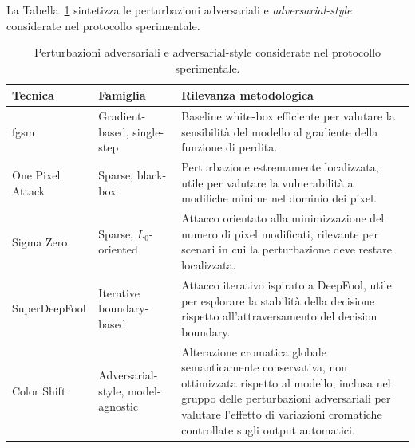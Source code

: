 La Tabella~\ref{tab:background_attack_families} sintetizza le perturbazioni adversariali e \textit{adversarial-style} considerate nel protocollo sperimentale.
\begin{table}[htbp]
    \centering
    \small
    \renewcommand{\arraystretch}{1.25}
    \begin{tabularx}{\textwidth}{@{}l l X@{}}
        \toprule
        \textbf{Tecnica} & \textbf{Famiglia} & \textbf{Rilevanza metodologica} \\
        \midrule
        \gls{fgsm} &
        Gradient-based, single-step &
        Baseline white-box efficiente per valutare la sensibilità del modello
        al gradiente della funzione di perdita. \\
        One Pixel Attack &
        Sparse, black-box &
        Perturbazione estremamente localizzata, utile per valutare la
        vulnerabilità a modifiche minime nel dominio dei pixel. \\
        Sigma Zero &
        Sparse, \(L_0\)-oriented &
        Attacco orientato alla minimizzazione del numero di pixel modificati,
        rilevante per scenari in cui la perturbazione deve restare localizzata. \\
        SuperDeepFool &
        Iterative boundary-based &
        Attacco iterativo ispirato a DeepFool, utile per esplorare la stabilità
        della decisione rispetto all'attraversamento del decision boundary. \\

        Color Shift &
        Adversarial-style, model-agnostic &
        Alterazione cromatica globale semanticamente conservativa, non ottimizzata
        rispetto al modello, inclusa nel gruppo delle perturbazioni adversariali per valutare l'effetto
        di variazioni cromatiche controllate sugli output automatici. \\

        \bottomrule
    \end{tabularx}
    \caption{Perturbazioni adversariali e adversarial-style considerate nel protocollo sperimentale.}
    \label{tab:background_attack_families}
\end{table}


